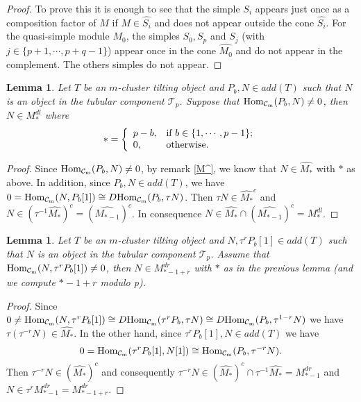 \documentclass{amsart}
\theoremstyle{plain}
\newtheorem{lema}[teo]{Lemma}
\theoremstyle{definition}
\begin{document}
\begin{proof} To prove this it is enough to see that the  simple $S_i$ appears just once  as a composition factor of  $M$ if $M\in \widehat{S_i}$ and does not appear outside  the cone  $\widehat{S_i}$. For the  quasi-simple module $M_0$, the simples $S_0, S_p$ and $S_j$ (with
$j\in\{p+1, \cdots, p+q-1\} $)  appear once in the  cone
$\widehat{M_0}$ and do not appear in the complement. The others  simples  do not appear.
\end{proof}

\begin{lema}\label{elementos del tubo q tienen morf desde un proy}
Let $T$ be an  $m$-cluster tilting object and  $P_b, N\in add(T)$ such that  $N$  is an  object in the tubular component $\mathcal{T}_p$. Suppose that ${\mathop{\rm Hom_{\mathcal{C}_m}}\nolimits}(P_b,N)\neq 0$, then  $N\in
M_*^{dl}$ where $$*=\left\{
                     \begin{array}{ll}
                       p-b, & \hbox{if $b\in\{1,\cdots, p-1\}$;} \\
                       0, & \hbox{otherwise.}
                     \end{array}
                   \right.
$$
\end{lema}

\begin{proof}
Since ${\mathop{\rm Hom_{\mathcal{C}_m}}\nolimits}(P_b,N)\neq 0$, by remark \ref{M^}, we know that  $N\in \widehat{M_*}$ with $*$ as above. In addition, since  $P_b, N\in add(T)$, we have  $0={\mathop{\rm Hom_{\mathcal{C}_m}}\nolimits}(N,P_b[1])\cong
 D {\mathop{\rm Hom_{\mathcal{C}_m}}\nolimits}(P_b,\tau N)$. Then  $\tau N\in \widehat{M_*}^c$ and $N\in
(\tau^{-1}\widehat{M_*})^c=(\widehat{M_{*-1}})^c$. In consequence
$N\in \widehat{M_*}\cap (\widehat{M_{*-1}})^c=M_*^{dl} $.
\end{proof}

\begin{lema}\label{tubo tauideproy[1]}
Let $T$ be an  $m$-cluster tilting object and $N, \tau^rP_b[1]\in add(T)$ such that  $N$  is an object in the tubular component $\mathcal{T}_p$. Assume that ${\mathop{\rm Hom_{\mathcal{C}_m}}\nolimits}(N,\tau^rP_b[1])\neq 0$,
then $N\in M_{*-1+r}^{dr}$ with $*$ as in the previous lemma (and we compute $*-1+r$ modulo p).
\end{lema}

\begin{proof}
Since  $0 \neq {\mathop{\rm Hom_{\mathcal{C}_m}}\nolimits}(N,\tau^rP_b[1])\cong D{\mathop{\rm Hom_{\mathcal{C}_m}}\nolimits}(\tau^rP_b,\tau N)
\cong D {\mathop{\rm Hom_{\mathcal{C}_m}}\nolimits}(P_b,\tau^{1-r}N)$ we have  $\tau(\tau^{-r}N)\in
\widehat{M_*}$. In the other hand, since $\tau^rP_b[1], N\in add(T)$ we have
$$0={\mathop{\rm Hom_{\mathcal{C}_m}}\nolimits}(\tau^rP_b[1], N[1])\cong {\mathop{\rm Hom_{\mathcal{C}_m}}\nolimits}(P_b,\tau^{-r}N).$$
 Then
$\tau^{-r}N\in (\widehat{M_*})^c$ and consequently  $\tau^{-r}N\in
(\widehat{M_*})^c \cap \tau^{-1}\widehat{M_*}=M_{*-1}^{dr} $ and $N\in
\tau^rM_{*-1}^{dr}=M_{*-1+r}^{dr}$.
\end{proof}
\end{document}

